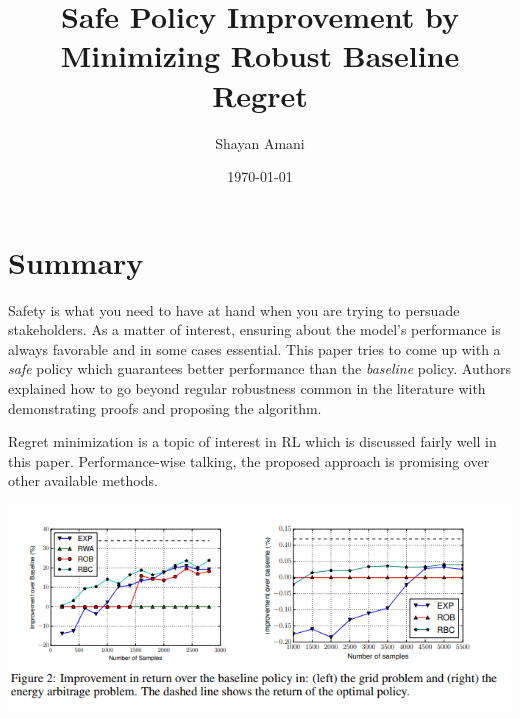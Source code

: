 \documentclass[a4paper,12pt]{article}
\title{Safe Policy Improvement by Minimizing Robust Baseline Regret}
\author{Shayan Amani}
\date{\today}
\begin{document}
\maketitle

\section{Summary}
Safety is what you need to have at hand when you are trying to persuade stakeholders. As a matter of interest, ensuring about the model's performance is always favorable and in some cases essential. This paper tries to come up with a \textit{safe} policy which guarantees better performance than the \textit{baseline} policy. Authors explained how to go beyond regular robustness common in the literature with demonstrating proofs and proposing the algorithm. 

Regret minimization is a topic of interest in RL which is discussed fairly well in this paper. Performance-wise talking, the proposed approach is promising over other available methods. 

\includegraphics[width=1\columnwidth]{fig2.png}
\end{document}
